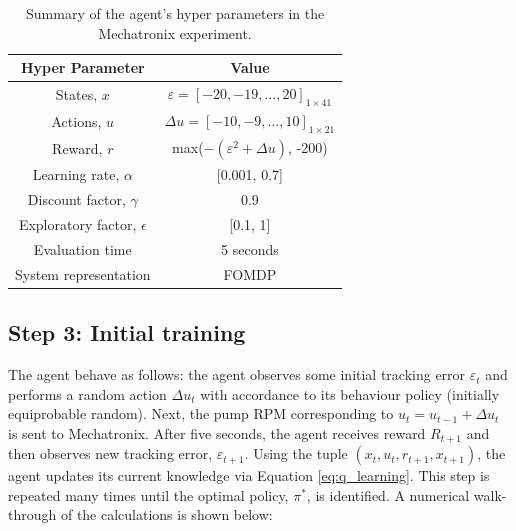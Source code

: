 \begin{table}[H]
\caption{Summary of the agent's hyper parameters in the Mechatronix experiment.}
\label{tab:rl_system1_params}
\centering
\begin{tabular}{c|c}
\textbf{Hyper Parameter}     & Value  \\
\hline
States, $x$	             	& $\varepsilon = [-20, -19, ..., 20]_{1 \times 41} $		 \\
Actions, $u$               & $\Delta u = [-10, -9, ..., 10]_{1 \times 21}$		\\
Reward, $r$	               & max($-(\varepsilon^2 + \Delta u)$, -200)		\\
Learning rate, $\alpha$		& [0.001, 0.7]		 \\
Discount factor, $\gamma$      	& 0.9  \\
Exploratory factor, $\epsilon$             & [0.1, 1]  \\
Evaluation time                 & 5 seconds \\
System representation           & FOMDP \\
\end{tabular}
\end{table}

\subsection{Step 3: Initial training}
The agent behave as follows: the agent observes some initial tracking error $\varepsilon_t$ and performs a random action $\Delta u_t$ with accordance to its behaviour policy (initially equiprobable random).  Next, the pump RPM corresponding to $u_t = u_{t-1} + \Delta u_t$ is sent to Mechatronix.  After five seconds, the agent receives reward $R_{t+1}$ and then observes new tracking error, $\varepsilon_{t+1}$. Using the tuple $(x_t, u_t, r_{t+1}, x_{t+1})$, the agent updates its current knowledge via Equation \ref{eq:q_learning}. This step is repeated many times until the optimal policy, $\pi^*$, is identified. A numerical walk-through of the calculations is shown below:

